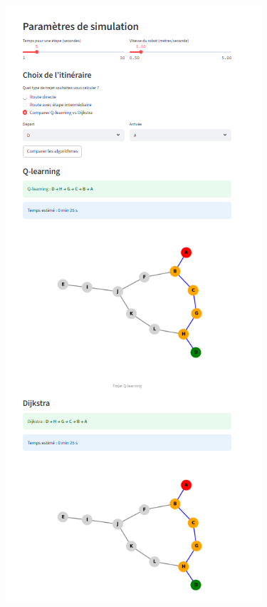 \documentclass{article}
\begin{document}
\begin{figure}[htbp]
\begin{minipage}[b]{0.45\textwidth}
    \includegraphics[width=\textwidth]{image6.png}

\end{minipage}
\end{figure}
\end{document}
